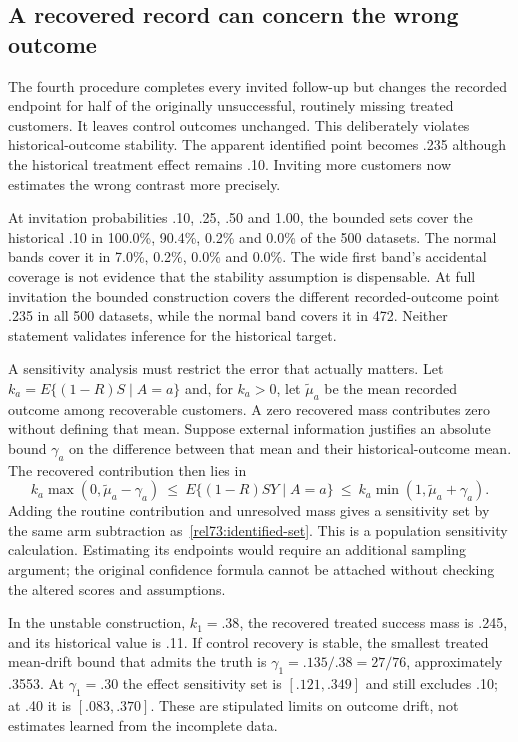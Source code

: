 \subsection{A recovered record can concern the wrong outcome}

The fourth procedure completes every invited follow-up but changes the
recorded endpoint for half of the originally unsuccessful, routinely missing
treated customers. It leaves control outcomes unchanged. This deliberately
violates historical-outcome stability. The apparent identified point becomes
.235 although the historical treatment effect remains .10. Inviting more
customers now estimates the wrong contrast more precisely.

At invitation probabilities .10, .25, .50 and 1.00, the bounded sets cover
the historical .10 in 100.0\%, 90.4\%, 0.2\% and 0.0\% of the 500
datasets. The normal bands cover it in 7.0\%, 0.2\%, 0.0\% and 0.0\%.
The wide first band's accidental coverage is not evidence that the stability
assumption is dispensable. At full invitation the bounded construction
covers the different recorded-outcome point .235 in all 500 datasets,
while the normal band covers it in 472. Neither statement validates
inference for the historical target.

A sensitivity analysis must restrict the error that actually matters.
Let $k_a=E\{(1-R)S\mid A=a\}$ and, for $k_a>0$, let
$\widetilde\mu_a$ be the mean recorded outcome among recoverable customers.
A zero recovered mass contributes zero without defining that mean.
Suppose external information
justifies an absolute bound $\gamma_a$ on the difference between that mean
and their historical-outcome mean. The recovered contribution then lies in
\[
 k_a\max(0,\widetilde\mu_a-\gamma_a)
 \ \leq\ E\{(1-R)SY\mid A=a\}\ \leq\
 k_a\min(1,\widetilde\mu_a+\gamma_a).
\]
Adding the routine contribution and unresolved mass gives a sensitivity set
by the same arm subtraction as~\eqref{rel73:identified-set}. This is a
population sensitivity calculation. Estimating its endpoints would require
an additional sampling argument; the original confidence formula cannot be
attached without checking the altered scores and assumptions.

In the unstable construction, $k_1=.38$, the recovered treated success mass
is .245, and its historical value is .11. If control recovery is stable,
the smallest treated mean-drift bound that admits the truth is
$\gamma_1=.135/.38=27/76$, approximately .3553. At $\gamma_1=.30$ the
effect sensitivity set is $[.121,.349]$ and still excludes .10; at .40 it
is $[.083,.370]$. These are stipulated limits on outcome drift, not estimates
learned from the incomplete data.

